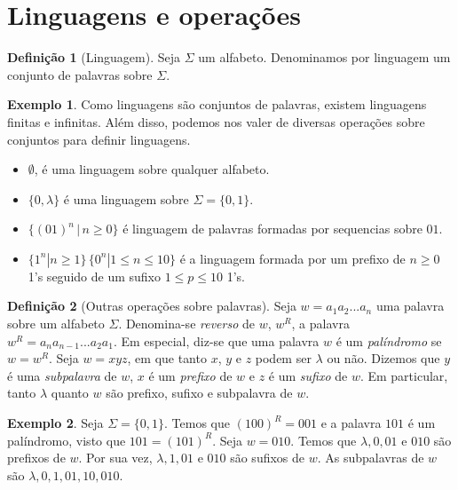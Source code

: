 \documentclass[a4paper]{article}
\theoremstyle{definition}
\newtheorem{Example}{Exemplo}
\newtheorem{Definition}{Definição}
\begin{document}
  \section{Linguagens e operações}

  \begin{Definition}[Linguagem]
    Seja $\Sigma$ um alfabeto. Denominamos por linguagem um conjunto de palavras
    sobre $\Sigma$.
  \end{Definition}

  \begin{Example}
    Como linguagens são conjuntos de palavras, existem linguagens finitas e
    infinitas. Além disso, podemos nos valer de diversas operações sobre
    conjuntos para definir linguagens.
    \begin{itemize}
      \item $\emptyset$, é uma linguagem sobre qualquer alfabeto.
      \item $\{0, \lambda\}$ é uma linguagem sobre $\Sigma =\{0,1\}$.
      \item $\{(01)^n\,|\,n \geq 0\}$ é linguagem de palavras formadas por
        sequencias sobre $01$.
      \item $\{1^n| n \geq 1\}\,\{0^n| 1 \leq n \leq 10\}$ é a linguagem
           formada por um prefixo de $n \geq 0$ 1's seguido de um sufixo $1 \leq
           p \leq 10$ 1's.
    \end{itemize}
  \end{Example}

  \begin{Definition}[Outras operações sobre palavras]
    Seja $w = a_1a_2...a_n$ uma palavra sobre um alfabeto $\Sigma$. Denomina-se
    \emph{reverso} de $w$, $w^R$, a palavra $w^R = a_n a_{n - 1}...a_2a_1$.
    Em especial, diz-se que uma palavra $w$ é um \emph{palíndromo} se
    $w = w^R$.  Seja $w = xyz$, em que tanto $x$, $y$ e $z$ podem ser $\lambda$
    ou não. Dizemos que $y$ é uma \emph{subpalavra} de $w$, $x$ é um
    \emph{prefixo} de $w$ e $z$ é um \emph{sufixo} de $w$. Em particular, tanto
    $\lambda$ quanto $w$ são prefixo, sufixo e subpalavra de $w$.
  \end{Definition}

  \begin{Example}
    Seja $\Sigma = \{0,1\}$. Temos que $(100)^R = 001$ e a palavra $101$ é um
    palíndromo, visto que $101 = (101)^R$. Seja $w = 010$. Temos que
    $\lambda, 0,01$ e $010$ são prefixos de $w$. Por sua vez,
    $\lambda,1, 01$ e $010$ são sufixos de $w$. As subpalavras de $w$ são
    $\lambda, 0, 1, 01, 10, 010$.
  \end{Example}
\end{document}
